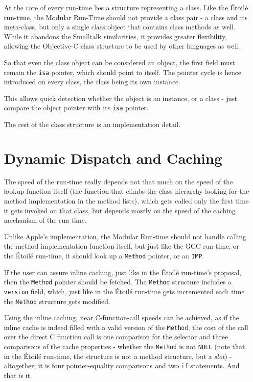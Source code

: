 At the core of every run-time lies a structure representing a class. Like the \'Etoil\'e run-time, the Modular Run-Time should not provide a class pair - a class and its meta-class, but only a single class object that contains class methods as well. While it abandons the Smalltalk similarities, it provides greater flexibility, allowing the Objective-C class structure to be used by other languages as well.

So that even the class object can be considered an object, the first field must remain the \verb=isa= pointer, which should point to itself. The pointer cycle is hence introduced on every class, the class being its own instance.

This allows quick detection whether the object is an instance, or a class - just compare the object pointer with its \verb=isa= pointer.

The rest of the class structure is an implementation detail.

\section{Dynamic Dispatch and Caching}

The speed of the run-time really depends not that much on the speed of the lookup function itself (the function that climbs the class hierarchy looking for the method implementation in the method lists), which gets called only the first time it gets invoked on that class, but depends mostly on the speed of the caching mechanism of the run-time.

Unlike Apple's implementation, the Modular Run-time should not handle calling the method implementation function itself, but just like the GCC run-time, or the \'Etoil\'e run-time, it should look up a \verb=Method= pointer, or an \verb=IMP=.

If the user can assure inline caching, just like in the \'Etoil\'e run-time's proposal, then the \verb=Method= pointer should be fetched. The \verb=Method= structure includes a \verb=version= field, which, just like in the \'Etoil\'e run-time gets incremented each time the \verb=Method= structure gets modified.

Using the inline caching, near C-function-call speeds can be achieved, as if the inline cache is indeed filled with a valid version of the \verb=Method=, the cost of the call over the direct C function call is one comparison for the selector and three comparisons of the cache properties - whether the \verb=Method= is not \verb=NULL= (note that in the \'Etoil\'e run-time, the structure is not a method structure, but a \emph{slot}) - altogether, it is four pointer-equality comparisons and two \verb=if= statements. And that is it.

